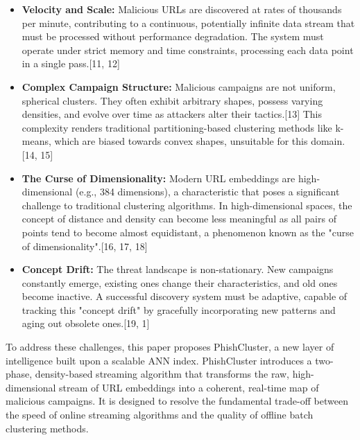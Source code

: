 \documentclass[journal,article,submit,pdftex,moreauthors]{Definitions/mdpi}
\begin{document}
\begin{itemize}
    \item \textbf{Velocity and Scale:} Malicious URLs are discovered at rates of thousands per minute, contributing to a continuous, potentially infinite data stream that must be processed without performance degradation. The system must operate under strict memory and time constraints, processing each data point in a single pass.[11, 12]
    \item \textbf{Complex Campaign Structure:} Malicious campaigns are not uniform, spherical clusters. They often exhibit arbitrary shapes, possess varying densities, and evolve over time as attackers alter their tactics.[13] This complexity renders traditional partitioning-based clustering methods like k-means, which are biased towards convex shapes, unsuitable for this domain.[14, 15]
    \item \textbf{The Curse of Dimensionality:} Modern URL embeddings are high-dimensional (e.g., 384 dimensions), a characteristic that poses a significant challenge to traditional clustering algorithms. In high-dimensional spaces, the concept of distance and density can become less meaningful as all pairs of points tend to become almost equidistant, a phenomenon known as the "curse of dimensionality".[16, 17, 18]
    \item \textbf{Concept Drift:} The threat landscape is non-stationary. New campaigns constantly emerge, existing ones change their characteristics, and old ones become inactive. A successful discovery system must be adaptive, capable of tracking this "concept drift" by gracefully incorporating new patterns and aging out obsolete ones.[19, 1]
\end{itemize}

To address these challenges, this paper proposes PhishCluster, a new layer of intelligence built upon a scalable ANN index. PhishCluster introduces a two-phase, density-based streaming algorithm that transforms the raw, high-dimensional stream of URL embeddings into a coherent, real-time map of malicious campaigns. It is designed to resolve the fundamental trade-off between the speed of online streaming algorithms and the quality of offline batch clustering methods.
\end{document}
